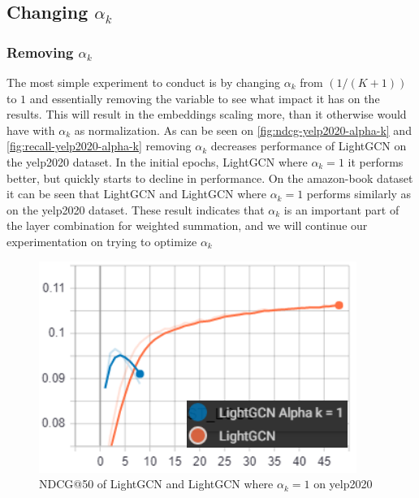 \subsection{Changing $\alpha_k$}

\subsubsection{Removing $\alpha_k$}\label{subsubsec:remove-alpha-k}
The most simple experiment to conduct is by changing $\alpha_k$ from $(1 / (K + 1))$ to $1$ and essentially removing the variable to see what impact it has on the results.
This will result in the embeddings scaling more, than it otherwise would have with $\alpha_k$ as normalization.
As can be seen on \autoref{fig:ndcg-yelp2020-alpha-k} and \autoref{fig:recall-yelp2020-alpha-k} removing $\alpha_k$ decreases performance of LightGCN on the yelp2020 dataset.
In the initial epochs, LightGCN where $\alpha_k = 1$ it performs better, but quickly starts to decline in performance.
On the amazon-book dataset it can be seen that LightGCN and LightGCN where $\alpha_k = 1$ performs similarly as on the yelp2020 dataset.
These result indicates that $\alpha_k$ is an important part of the layer combination for weighted summation, and we will continue our experimentation on trying to optimize $\alpha_k$
\begin{figure}
    \includegraphics[width=\linewidth]{figures/alpha-k-results/yelp2020-ndcg.png}
    \caption{NDCG@50 of LightGCN and LightGCN where $\alpha_k = 1$ on yelp2020}
    \label{fig:ndcg-yelp2020-alpha-k}
\end{figure}
